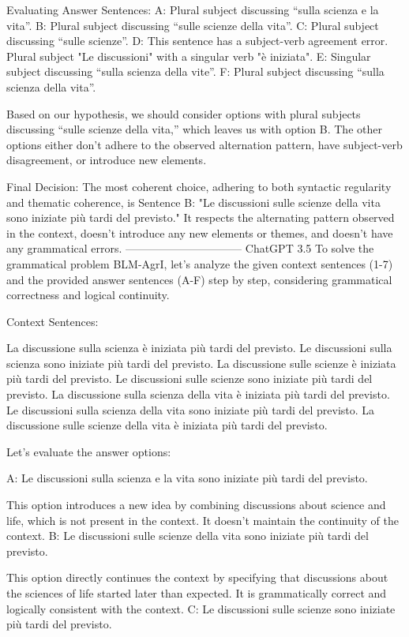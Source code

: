 Evaluating Answer Sentences:
A: Plural subject discussing “sulla scienza e la vita”.
B: Plural subject discussing “sulle scienze della vita”.
C: Plural subject discussing “sulle scienze”.
D: This sentence has a subject-verb agreement error. Plural subject "Le discussioni" with a singular verb "è iniziata".
E: Singular subject discussing “sulla scienza della vite”.
F: Plural subject discussing “sulla scienza della vita”.

Based on our hypothesis, we should consider options with plural subjects discussing “sulle scienze della vita,” which leaves us with option B. The other options either don’t adhere to the observed alternation pattern, have subject-verb disagreement, or introduce new elements.

Final Decision:
The most coherent choice, adhering to both syntactic regularity and thematic coherence, is Sentence B: "Le discussioni sulle scienze della vita sono iniziate più tardi del previsto." It respects the alternating pattern observed in the context, doesn't introduce any new elements or themes, and doesn't have any grammatical errors.
--------------------------------
ChatGPT 3.5 
To solve the grammatical problem BLM-AgrI, let's analyze the given context sentences (1-7) and the provided answer sentences (A-F) step by step, considering grammatical correctness and logical continuity.

Context Sentences:

La discussione sulla scienza è iniziata più tardi del previsto.
Le discussioni sulla scienza sono iniziate più tardi del previsto.
La discussione sulle scienze è iniziata più tardi del previsto.
Le discussioni sulle scienze sono iniziate più tardi del previsto.
La discussione sulla scienza della vita è iniziata più tardi del previsto.
Le discussioni sulla scienza della vita sono iniziate più tardi del previsto.
La discussione sulle scienze della vita è iniziata più tardi del previsto.

Let's evaluate the answer options:

A: Le discussioni sulla scienza e la vita sono iniziate più tardi del previsto.

This option introduces a new idea by combining discussions about science and life, which is not present in the context. It doesn't maintain the continuity of the context.
B: Le discussioni sulle scienze della vita sono iniziate più tardi del previsto.

This option directly continues the context by specifying that discussions about the sciences of life started later than expected. It is grammatically correct and logically consistent with the context.
C: Le discussioni sulle scienze sono iniziate più tardi del previsto.

